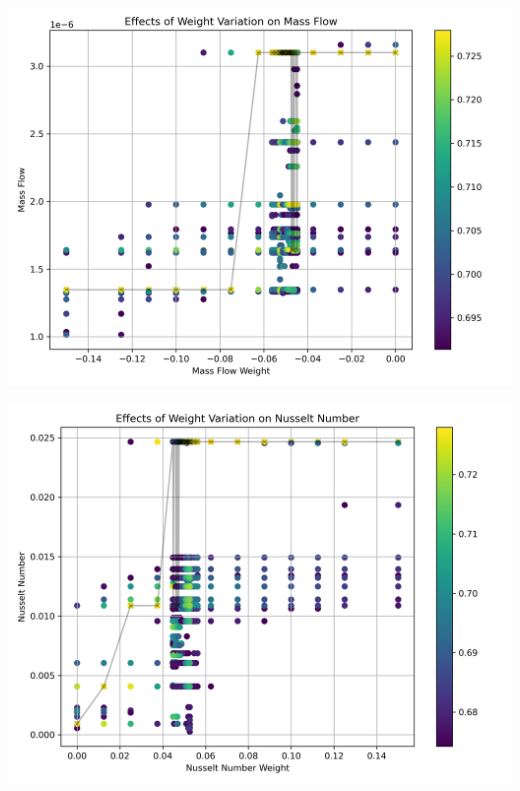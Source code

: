 \documentclass{homework}
\begin{document}
\begin{multicols}{2}
  \begin{minipage}{\linewidth}
      \centering
      \includegraphics[width=\linewidth]{images/mass_flow_sensitivity.png}
      \label{fig:mass_sens}
  \end{minipage}  

\begin{minipage}{\linewidth}
  \centering
  \includegraphics[width=\linewidth]{images/nusselt_number_sensitivity.png}
  \label{fig:nusselt_sens}
\end{minipage} 


\end{multicols}
\end{document}
